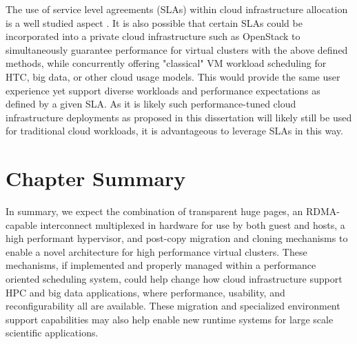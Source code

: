 The use of service level agreements (SLAs) within cloud infrastructure allocation is a well studied aspect \cite{serrano2013towards}.  It is also possible that certain SLAs could be incorporated into a private cloud infrastructure such as OpenStack to simultaneously guarantee performance for virtual clusters with the above defined methods, while concurrently offering "classical" VM workload scheduling for HTC, big data, or other cloud usage models. This would provide the same user experience yet support diverse workloads and performance expectations as defined by a given SLA. As it is likely such performance-tuned cloud infrastructure deployments as proposed in this dissertation will likely still be used for traditional cloud workloads, it is advantageous to leverage SLAs in this way.   

 

\section{Chapter Summary}
\label{chap7sum}



In summary, we expect the combination of transparent huge pages, an RDMA-capable interconnect multiplexed in hardware for use by both guest and hosts, a high performant hypervisor, and post-copy migration and cloning mechanisms to enable a novel architecture for high performance virtual clusters. These mechanisms, if implemented and properly managed within a performance oriented scheduling system, could help change how cloud infrastructure support HPC and big data applications, where performance, usability, and reconfigurability all are available.  These migration and specialized environment support capabilities may also help enable new runtime systems for large scale scientific applications. 






